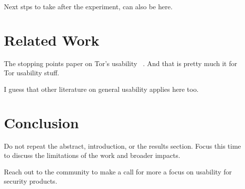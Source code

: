 \documentclass{sig-alternate-hotpets15}
\begin{document}
Next stps to take after the experiment, can also be here. %

\section{Related Work} %
The stopping points paper on Tor's usability ~\cite{norcie2012eliminating}. 
And that is pretty much it for Tor usability stuff. %

I guess that other literature on general usability applies here too. %

\section{Conclusion} 
Do not repeat the abstract, introduction, or the results section. 
Focus this time to discuss the limitations of the work and broader impacts. 

Reach out to the community to make a call for more a focus on usability for security products. 



 
\end{document}
